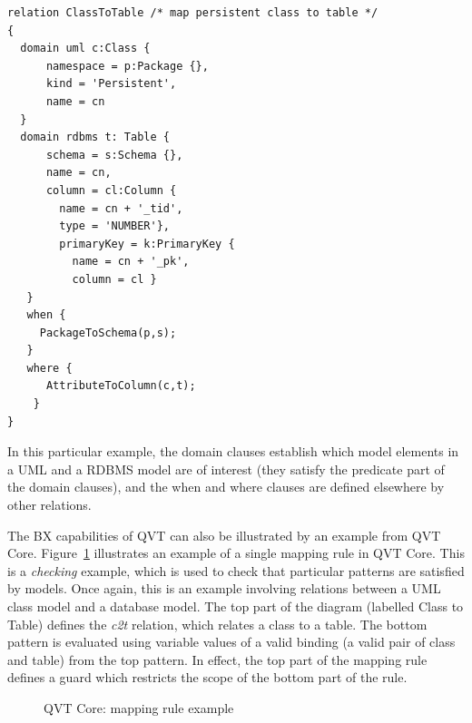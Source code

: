 \begin{lstlisting}[caption=An example of QVT Relations, label=listing:qvt-relations]
relation ClassToTable /* map persistent class to table */
{
  domain uml c:Class {
      namespace = p:Package {},
      kind = 'Persistent',
      name = cn
  }
  domain rdbms t: Table {
      schema = s:Schema {},
      name = cn,
      column = cl:Column {
        name = cn + '_tid',
        type = 'NUMBER'},
        primaryKey = k:PrimaryKey {
          name = cn + '_pk',
          column = cl }
   }
   when { 
     PackageToSchema(p,s);
   }
   where {
      AttributeToColumn(c,t);
    }
}
\end{lstlisting}
In this particular example, the domain clauses establish which model elements in a UML and a RDBMS model are of interest (they satisfy the predicate part of the domain clauses), and the when and where clauses are defined elsewhere by other relations.

The BX capabilities of QVT can also be illustrated by an example from QVT Core. Figure~\ref{fig:qvt-core} illustrates an example of a single mapping rule in QVT Core. This is a \textit{checking} example, which is used to check that particular patterns are satisfied by models. Once again, this is an example involving relations between a UML class model and a database model. The top part of the diagram (labelled Class to Table) defines the \textit{c2t} relation, which relates a class to a table. The bottom pattern is evaluated using variable values of a valid binding (a valid pair of class and table) from the top pattern. In effect, the top part of the mapping rule defines a guard which restricts the scope of the bottom part of the rule.

\begin{figure}[htbp]
\label{fig:qvt-core}
\caption{QVT Core: mapping rule example}
\end{figure}

